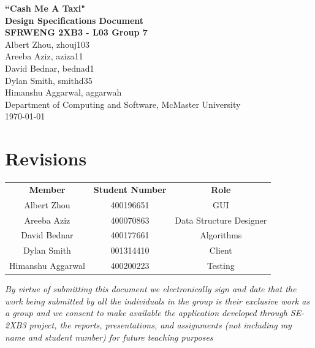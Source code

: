 \documentclass[12pt]{article}
\begin{document}
\begin{center}
    \vspace*{\fill}
  {\large \textbf{``Cash Me A Taxi"}}\\[2mm]
  {\large \textbf{Design Specifications Document}}\\[2mm]
  {\large \textbf{SFRWENG 2XB3 - L03 Group 7}}\\[8mm]
  {\large Albert Zhou, zhouj103}\\[2mm]
  {\large Areeba Aziz, aziza11}\\[2mm]
  {\large David Bednar, bednad1}\\[2mm]
  {\large Dylan Smith, smithd35}\\[2mm]
  {\large Himanshu Aggarwal, aggarwah}\\[6mm]
  {\large Department of Computing and Software, McMaster University}\\[6mm]
  {\large \today}
  \vspace*{\fill}
\end{center}

\newpage

\section*{Revisions}

\begin{center}
\begin{tabular}{|c|c|c|}
\cline{1-3}
\textbf{Member} & \textbf{Student Number} & \textbf{Role}\\
\cline{1-3}
Albert Zhou & 400196651 & GUI\\
\cline{1-3}
Areeba Aziz & 400070863 & Data Structure Designer\\
\cline{1-3}
David Bednar & 400177661 & Algorithms\\
\cline{1-3}
Dylan Smith & 001314410 & Client\\
\cline{1-3}
Himanshu Aggarwal & 400200223 & Testing\\

\cline{1-3}
\end{tabular}
\end{center}

\noindent \emph{By virtue of submitting this document we electronically sign and date that the work being submitted by all the individuals in the group is their exclusive work as a group and we consent to make available the application developed through SE-2XB3 project, the reports, presentations, and assignments (not including my name and student number) for future teaching purposes}
\end{document}
